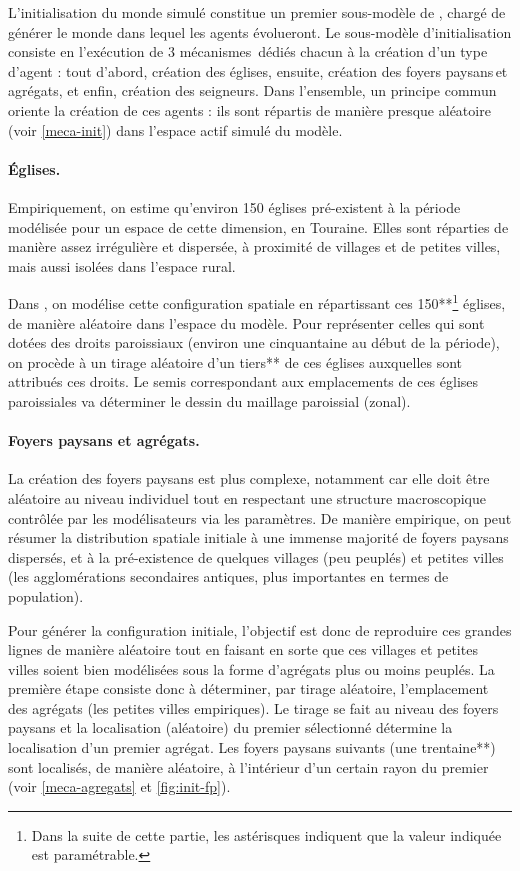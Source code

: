 L'initialisation du monde simulé constitue un premier \og sous-modèle\fg{} de \simfeodal{}, chargé de générer le monde dans lequel les agents évolueront.
Le sous-modèle d'initialisation consiste en l'exécution de 3 mécanismes dédiés chacun à la création d'un type d'agent : tout d'abord, création des églises, ensuite, création des foyers paysans et agrégats, et enfin, création des seigneurs.
Dans l'ensemble, un principe commun oriente la création de ces agents : ils sont répartis de manière presque aléatoire (voir \cref{meca-init}) dans l'espace \og actif\fg{} simulé du modèle.

\paragraph{Églises.}
Empiriquement, on estime qu'environ 150 églises pré-existent à la période modélisée pour un espace de cette dimension, en Touraine.
Elles sont réparties de manière assez irrégulière et dispersée, à proximité de villages et de petites villes, mais aussi isolées dans l'espace rural.

Dans \simfeodal{}, on modélise cette configuration spatiale en répartissant ces 150**\footnote{
	Dans la suite de cette partie, les astérisques indiquent que la valeur indiquée est paramétrable.
} églises, de manière aléatoire dans l'espace du modèle.
Pour représenter celles qui sont dotées des droits paroissiaux (environ une cinquantaine au début de la période), on procède à un tirage aléatoire d'un tiers** de ces églises auxquelles sont attribués ces droits.
Le semis correspondant aux emplacements de ces églises paroissiales va déterminer le dessin du maillage paroissial (zonal).

\paragraph{Foyers paysans et agrégats.}
La création des foyers paysans est plus complexe, notamment car elle doit être aléatoire au niveau individuel tout en respectant une structure macroscopique contrôlée par les modélisateurs via les paramètres.
De manière empirique, on peut résumer la distribution spatiale initiale à une immense majorité de foyers paysans dispersés, et à la pré-existence de quelques villages (peu peuplés) et petites villes (les agglomérations secondaires antiques, plus importantes en termes de population).

Pour générer la configuration initiale, l'objectif est donc de reproduire ces grandes lignes de manière aléatoire tout en faisant en sorte que ces villages et petites villes soient bien modélisées sous la forme d'agrégats plus ou moins peuplés.
La première étape consiste donc à déterminer, par tirage aléatoire, l'emplacement des agrégats (les \og petites villes\fg{} empiriques).
Le tirage se fait au niveau des foyers paysans et la localisation (aléatoire) du premier sélectionné détermine la localisation d'un premier agrégat.
Les foyers paysans suivants (une trentaine**) sont localisés, de manière aléatoire, à l'intérieur d'un certain rayon du premier (voir \cref{meca-agregats} et \cref{fig:init-fp}).

